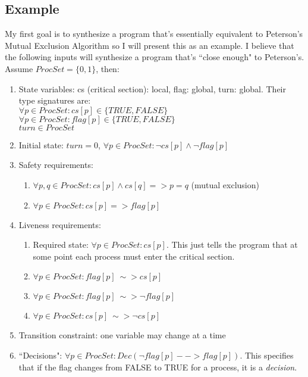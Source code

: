 \documentclass[12pt]{article}
\begin{document}
\subsection{Example}
My first goal is to synthesize a program that's essentially equivalent to Peterson's Mutual Exclusion Algorithm so I will present this as an example.  I believe that the following inputs will synthesize a program that's ``close enough" to Peterson's.  Assume $ProcSet = \{0,1\}$, then:
	\begin{enumerate}
		\item State variables: cs (critical section): local, flag: global, turn: global.  Their type signatures are: \\
				$\forall p \in ProcSet : cs[p] \in \{TRUE,FALSE\}$ \\
				$\forall p \in ProcSet : flag[p] \in \{TRUE,FALSE\}$ \\
				$turn \in ProcSet$
		\item Initial state: $turn = 0$, $\forall p \in ProcSet: \lnot cs[p] \wedge \lnot flag[p]$
		\item Safety requirements:
			\begin{enumerate}
				\item $\forall p,q \in ProcSet : cs[p] \wedge cs[q] => p = q$ (mutual exclusion)
				\item $\forall p \in ProcSet : cs[p] => flag[p]$
			\end{enumerate}
		\item Liveness requirements:
			\begin{enumerate}
				\item Required state: $\forall p \in ProcSet : cs[p]$.  This just tells the program that at some point each process must enter the critical section.  
				\item $\forall p \in ProcSet : flag[p] ~\sim> cs[p]$
				\item $\forall p \in ProcSet : flag[p] ~\sim> \lnot flag[p]$
				\item $\forall p \in ProcSet : cs[p] ~\sim> \lnot cs[p]$
			\end{enumerate}
		\item Transition constraint: one variable may change at a time
		\item ``Decisions": $\forall p \in ProcSet : Dec(\lnot flag[p] --> flag[p])$.  This specifies that if the flag changes from FALSE to TRUE for a process, it is a \textit{decision}.  
	\end{enumerate}
\end{document}
